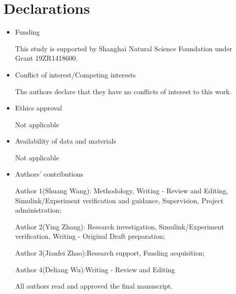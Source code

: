 \documentclass[sn-basic]{sn-jnl}
\theoremstyle{thmstyleone}%
\theoremstyle{thmstyletwo}%
\theoremstyle{thmstylethree}%
\theoremstyle{thmstyleone}%
\begin{document}
\section*{Declarations}

\begin{itemize}
\item Funding

This study is supported by Shanghai Natural Science Foundation under Grant 19ZR1418600.

\item Conflict of interest/Competing interests 

The authors declare that they have no conflicts of interest to this work.

\item Ethics approval 

Not applicable

\item Availability of data and materials

Not applicable

\item Authors' contributions

Author 1(Shuang Wang): Methodology, Writing - Review and Editing, Simulink/Experiment verification and guidance, Supervision, Project administration;

Author 2(Ying Zhang): Research investigation, Simulink/Experiment verification, Writing - Original Draft preparation;

Author 3(Jianfei Zhao):Research support, Funding acquisition;

Author 4(Deliang Wu):Writing - Review and Editing

All authors read and approved the final manuscript.
\end{itemize}


\end{document}
